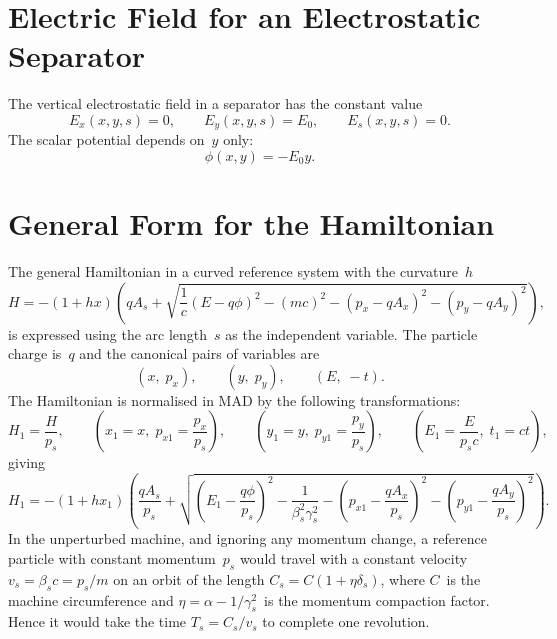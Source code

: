 \section{Electric Field for an Electrostatic Separator}
The vertical electrostatic field in a separator has the constant value
\begin{equation}
E_x(x,y,s) = 0, \qquad E_y(x,y,s) = E_0, \qquad E_s(x,y,s) = 0.
\end{equation}
The scalar potential depends on~$y$ only:
\begin{equation}
\phi(x,y) = - E_0 y.
\end{equation}
 
\section{General Form for the Hamiltonian}
The general Hamiltonian in a curved reference system with the
curvature~$h$
\begin{equation}
H = - (1 + h x) \left( q A_s +
  \sqrt{ \frac{1}{c} ( E - q \phi )^2 - (mc)^2 - 
         (p_x - q A_x)^2 - (p_y - q A_y)^2} \right),
\end{equation}
is expressed using the arc length~$s$ as the independent variable.
The particle charge is~$q$ and the canonical pairs of variables are
\begin{equation}
(x, \; p_x), \qquad (y, \; p_y), \qquad (E, \; -t).
\end{equation}
The Hamiltonian is normalised in MAD by the following transformations:
\begin{equation}
H_1 = \frac{H}{p_s}, \qquad
(x_1 = x, \; p_{x1} = \frac{p_x}{p_s}), \qquad
(y_1 = y, \; p_{y1} = \frac{p_y}{p_s}), \qquad
(E_1 = \frac{E}{p_s c}, \; t_1 = c t),
\end{equation}
giving
\begin{equation}
H_1 = - (1 + h x_1) \left( \frac{qA_s}{p_s} +
  \sqrt{ \left( E_1 - \frac{q\phi}{p_s} \right)^2 -
         \frac{1}{\beta_s^2\gamma_s^2} - 
         \left( p_{x1} - \frac{qA_x}{p_s} \right)^2 -
         \left( p_{y1} - \frac{qA_y}{p_s} \right)^2} \right ).
\end{equation}
In the unperturbed machine, and ignoring any momentum change, a
reference particle with constant momentum~$p_s$ would travel with a
constant velocity $v_s = \beta_s c = p_s / m$ on an orbit of the
length $C_s = C (1 + \eta \delta_s)$,
where $C$~is the machine circumference and 
$\eta = \alpha - 1/\gamma_s^2$~is the momentum compaction factor.
Hence it would take the time $T_s = C_s / v_s$ to complete one
revolution.
 
